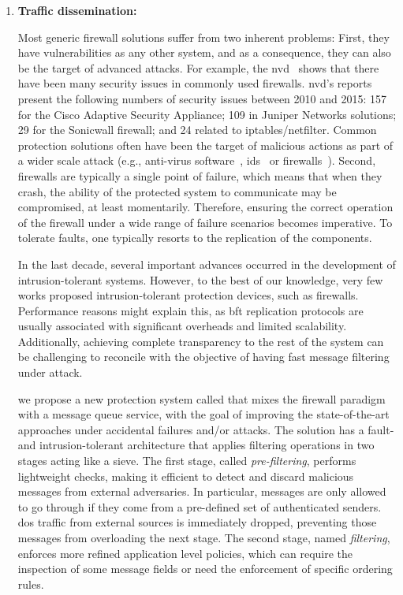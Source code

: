\begin{enumerate}

\item \textbf{Traffic dissemination:} 


Most generic firewall solutions suffer from two inherent problems: 
First, they have vulnerabilities as any other system, and as a consequence, they can also be the target of advanced attacks. 
For example, the \gls{nvd}~\cite{nvd} shows that there have been many security issues in commonly used firewalls. 
\gls{nvd}'s reports present the following numbers of security issues between 2010 and 2015: 157 for the Cisco Adaptive Security Appliance; 109 in Juniper Networks solutions; 29 for the Sonicwall firewall; and 24 related to iptables/netfilter. 
Common protection solutions often have been the target of malicious actions as part of a wider scale attack (e.g., anti-virus software~\cite{Chauhan:2011}, \gls{ids}~\cite{Anderson:2001} or firewalls~\cite{Kamara:2003,Surisetty:2010,cisco1,cisco2}).
Second, firewalls are typically a single point of failure, which means that when they crash, the ability of the protected system to communicate may be compromised, at least momentarily.
Therefore, ensuring the correct operation of the firewall under a wide range of failure scenarios becomes imperative.
To tolerate faults, one typically resorts to the replication of the components.

In the last decade, several important advances occurred in the development of intrusion-tolerant systems.
However, to the best of our knowledge, very few works proposed intrusion-tolerant protection devices, such as firewalls.
Performance reasons might explain this, as \gls{bft} replication protocols are usually associated with significant overheads and limited scalability.
Additionally, achieving complete transparency to the rest of the system can be challenging to reconcile with the objective of having fast message filtering under attack.


we propose a new protection system called \sieveq that mixes the firewall paradigm with a message queue service, with the goal of improving the state-of-the-art approaches under accidental failures and/or attacks.
The solution has a fault- and intrusion-tolerant architecture that applies filtering operations in two stages acting like a sieve.
The first stage, called \emph{pre-filtering}, performs lightweight checks, making it efficient to detect and discard malicious messages from external adversaries.
In particular, messages are only allowed to go through if they come from a pre-defined set of authenticated senders.
\gls{dos} traffic from external sources is immediately dropped, preventing those messages from overloading the next stage.
The second stage, named \emph{filtering}, enforces more refined application level policies, which can require the inspection of some message fields or need the enforcement of specific ordering rules.




\end{enumerate}
